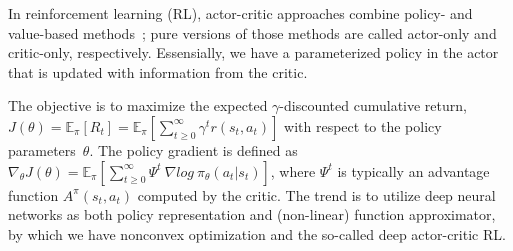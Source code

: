 
In reinforcement learning (RL),
actor-critic approaches combine policy- and value-based methods~\cite{6392457};
pure versions of those methods are called actor-only and critic-only, respectively.
Essensially, we have a parameterized policy in the actor that is
updated with information from the critic.

The objective is to maximize the expected $\gamma$-discounted cumulative return,
$J(\theta) = \mathbb{E}_{\pi} [R_t] = \mathbb{E}_{\pi} [ \sum_{t \ge 0}^{\infty} \gamma^t r(s_{t}, a_{t}) ]$
with respect to the policy parameters~$\theta$.
The policy gradient is defined as
$\nabla_{\theta} J(\theta) = \mathbb{E}_{\pi} [ \sum_{t \ge 0}^{\infty} \Psi^t~\nabla log~\pi_{\theta} (a_t | s_t) ]$,
where $\Psi^t$ is typically an advantage function $A^{\pi}(s_t,a_t)$ computed by the critic.
The trend is to utilize deep neural networks as both policy representation and
(non-linear) function approximator, by which we have nonconvex optimization and
the so-called deep actor-critic RL.
